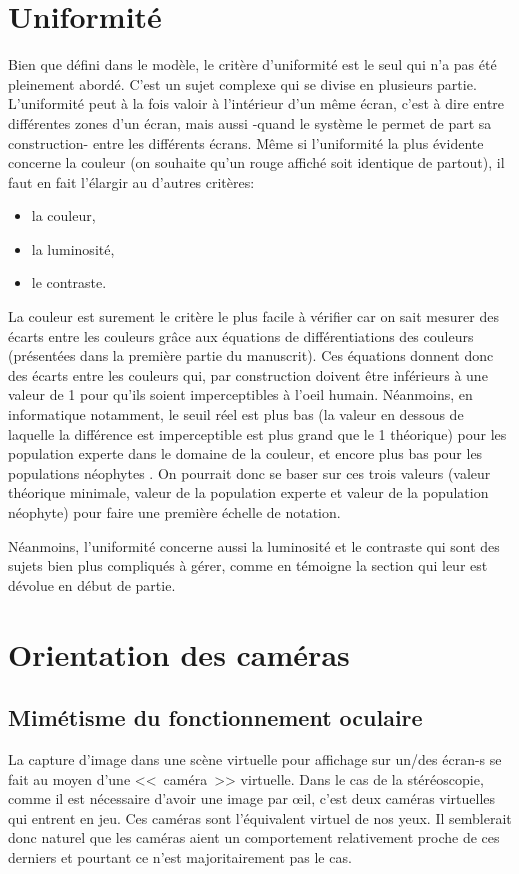 	\section{Uniformité}
	\par Bien que défini dans le modèle, le critère d'uniformité est le seul qui n'a pas été pleinement abordé. C'est un sujet complexe qui se divise en plusieurs partie. L'uniformité peut à la fois valoir à l'intérieur d'un même écran, c'est à dire entre différentes zones d'un écran, mais aussi -quand le système le permet de part sa construction- entre les différents écrans. Même si l'uniformité la plus évidente concerne la couleur (on souhaite qu'un rouge affiché soit identique de partout), il faut en fait l'élargir au d'autres critères:
	\begin{itemize}
		\item la couleur,
		\item la luminosité,
		\item le contraste.
	\end{itemize}
	
	\par La couleur est surement le critère le plus facile à vérifier car on sait mesurer des écarts entre les couleurs grâce aux équations de différentiations des couleurs (présentées dans la première partie du manuscrit). Ces équations donnent donc des écarts entre les couleurs qui, par construction doivent être inférieurs à une valeur de 1 pour qu'ils soient imperceptibles à l'oeil humain. Néanmoins, en informatique notamment, le seuil réel est plus bas (la valeur en dessous de laquelle la différence est imperceptible est plus grand que le 1 théorique) pour les population experte dans le domaine de la couleur, et encore plus bas pour les populations néophytes \citep{vidal_color-difference_2016}. On pourrait donc se baser sur ces trois valeurs (valeur théorique minimale, valeur de la population experte et valeur de la population néophyte) pour faire une première échelle de notation.
	
	\par Néanmoins, l'uniformité concerne aussi la luminosité et le contraste qui sont des sujets bien plus compliqués à gérer, comme en témoigne la section qui leur est dévolue en début de partie.
	
	\section{Orientation des caméras}	
	\subsection{Mimétisme du fonctionnement oculaire}	
	\par La capture d'image dans une scène virtuelle pour affichage sur un/des écran-s se fait au moyen d'une <<~caméra~>> virtuelle. Dans le cas de la stéréoscopie, comme il est nécessaire d'avoir une image par œil, c'est deux caméras virtuelles qui entrent en jeu. Ces caméras sont l'équivalent virtuel de nos yeux. Il semblerait donc naturel que les caméras aient un comportement relativement proche de ces derniers et pourtant ce n'est majoritairement pas le cas.
	
